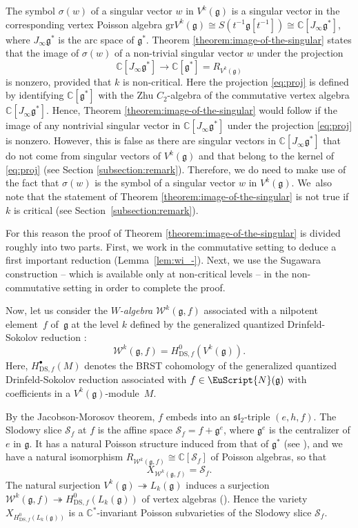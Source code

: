 \documentclass[JEP,XML,SOM,Unicode]{cedram}
\newcommand{\sbullet}{{\scriptscriptstyle\bullet}}
\newcommand{\DS}{\mathrm{DS}}
\let\mathcal \EuScript
\newcommand\C{{\mathbb C}}
\newcommand \g{\mathfrak g}
\newcommand \W{\mathscr{W}}
\theoremstyle{definition}
\begin{document}
The symbol $\sigma(w)$
of a singular vector $w$ in $V^k(\g)$ is
a singular vector
in the corresponding vertex Poisson algebra
$\mathrm{gr} V^k(\g) \cong S(t^{-1}\g[t^{-1}])\cong \C[J_{\infty}\g^*]$,
where $J_\infty \g^*$ is the arc space of $\g^*$.
Theorem \ref{theorem:image-of-the-singular}
states that
the image of $\sigma(w)$
of a non-trivial singular vector $w$
under the projection
\begin{equation}
\C[J_{\infty}\g^*]\to \C[\g^*]=R_{V^k(\g)}
\label{eq:proj}
\end{equation}
is nonzero,
provided that $k$ is non-critical.
Here the projection \eqref{eq:proj} is defined by identifying $\C[\g^*]$ with the
Zhu $C_2$-algebra of the commutative vertex algebra $\C[J_{\infty}\g^*]$.
Hence,
Theorem \ref{theorem:image-of-the-singular}
would follow if
the image of any nontrivial singular vector
in $\C[J_{\infty}\g^*]$
under the projection \eqref{eq:proj}
is nonzero.
However, this is false
as there are singular vectors in $\C[J_{\infty}\g^*]$
that do not come from singular vectors of $V^k(\g)$
and that belong to the kernel of \eqref{eq:proj}
(see Section \ref{subsection:remark}).
Therefore,
we do need to make use of the fact that
$\sigma(w)$ is the symbol of a singular vector $w$ in $V^k(\g)$.
We~also note that
the statement of Theorem \ref{theorem:image-of-the-singular}
is not true if $k$ is critical (see Section~\ref{subsection:remark}).

For this reason the proof of Theorem \ref{theorem:image-of-the-singular}
is divided roughly into two parts.
First, we work in the commutative setting
to deduce
a first important reduction (Lemma~\ref{lem:wi_-}).
Next, we use the Sugawara construction --
which is available only at non-critical levels -- in the non-commutative setting
in order to complete the proof.

Now, let us consider the \emph{$W$-algebra} $\W^k(\g,f)$ associated with
a nilpotent element~$f$ of~$\g$ at the level $k$
defined by the generalized quantized Drinfeld-Sokolov reduction
\cite{FeiFre90,KacRoaWak03}:
\[
\W^k(\g,f)=H^{0}_{\DS,f}(V^k(\g)).
\]
Here, $H^{\sbullet}_{\DS,f}(M)$ denotes the BRST
cohomology of the generalized quantized Drinfeld-Sokolov reduction
associated with $f \in \mathcal{N}(\g)$ with coefficients in
a $V^k(\g)$-module~$M$.

By the Jacobson-Morosov theorem, $f$ embeds into an $\mathfrak{sl}_2$-triple
$(e,h,f)$. The Slodowy slice $\mathscr{S}_{f}$ at $f$ is
the affine
space $\mathscr{S}_{f}=f+\g^{e}$, where $\g^{e}$
is the centralizer of $e$ in $\g$.
It has a natural Poisson structure induced from that of $\g^*$ (see \cite{GanGin02}),
and we have \cite{DSK06,Ara09b} a natural isomorphism
$R_{\W^k(\g,f)}\cong \C[\mathscr{S}_{f}]$ of Poisson algebras, so that
\begin{equation*}
X_{\W^k(\g,f)}= \mathscr{S}_{f}.
\end{equation*}
The natural surjection
$V^k(\g)\twoheadrightarrow L_k(\g)$
induces a surjection
$\W^k(\g,f)\twoheadrightarrow H_{\DS,f}^0(L_k(\g))$
of vertex algebras (\cite{Ara09b}).
Hence the variety
$X_{H^{0}_{\DS,f}(L_k(\g))}$
is a $\C^*$-invariant Poisson
subvarieties of the Slodowy slice $\mathscr{S}_f$.
\end{document}
